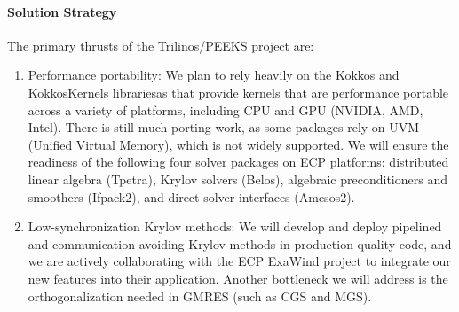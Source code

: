 \paragraph{Solution Strategy}

The primary thrusts of the Trilinos/PEEKS project are:
\begin{enumerate}
  \item Performance portability:
        We plan to rely heavily on the Kokkos and KokkosKernels librariesas that provide kernels that are performance portable across a variety of platforms, including CPU and GPU (NVIDIA, AMD, Intel). There is still much porting work, as some packages rely on UVM (Unified Virtual Memory), which is not widely supported.
        We will ensure the readiness of the following four solver packages on ECP platforms:
        distributed linear algebra (Tpetra), Krylov solvers (Belos), algebraic preconditioners and smoothers (Ifpack2), 
        and direct solver interfaces (Amesos2).
  \item Low-synchronization Krylov methods:
    	We will develop and deploy pipelined and 
	communication-avoiding Krylov methods in production-quality code, and 
	we are actively collaborating with the ECP ExaWind project to integrate 
        our new features into their application. Another bottleneck we will address is the orthogonalization needed in GMRES (such as CGS and MGS).
\end{enumerate}

